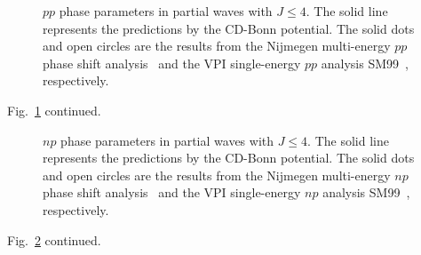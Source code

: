 \pagebreak

\begin{figure}
\vspace*{-3.0cm}
\hspace*{-1.7cm}
\vspace*{-3.0cm}
\caption{$pp$ phase parameters in partial waves with $J\leq 4$. 
The solid line represents the predictions by the CD-Bonn potential. 
The solid dots and open circles are the results from the Nijmegen
multi-energy $pp$ phase shift analysis~\protect\cite{Sto93} and the VPI
single-energy $pp$ analysis SM99~\protect\cite{SM99}, respectively.}
\label{fig_phpp1}
\end{figure}

\pagebreak

\vspace*{-3.0cm}
\hspace*{-1.7cm}
\vspace*{-3.0cm}
\begin{center}
Fig.~\ref{fig_phpp1} continued.
\end{center}



\pagebreak

\begin{figure}
\vspace*{-3.0cm}
\hspace*{-1.7cm}
\vspace*{-3.0cm}
\caption{$np$ phase parameters in partial waves with $J\leq 4$. 
The solid line represents the predictions by the CD-Bonn potential. 
The solid dots and open circles are the results from the Nijmegen
multi-energy $np$ phase shift analysis~\protect\cite{Sto93} and the VPI
single-energy $np$ analysis SM99~\protect\cite{SM99}, respectively.}
\label{fig_ph1}
\end{figure}



\pagebreak

\vspace*{-3.0cm}
\hspace*{-1.7cm}
\vspace*{-3.0cm}
\begin{center}
Fig.~\ref{fig_ph1} continued.
\end{center}



\pagebreak


